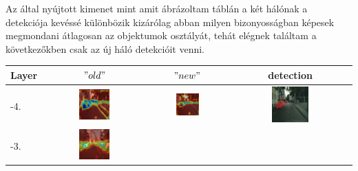 \documentclass[12pt,oneside,a4paper]{article}
\theoremstyle{remark}
\newcommand{\oldh}{\( "old" \)}\label{makro2}
\newcommand{\newh}{\( "new" \)}
\begin{document}
    Az  által nyújtott kimenet mint amit ábrázoltam  táblán\label{hivatkozas} a két hálónak a detekciója
    kevéssé különbözik kizárólag abban milyen bizonyosságban képesek megmondani átlagosan az objektumok osztályát, tehát elégnek találtam a következőkben csak az új háló detekcióit venni.


\begin{table}[h!]

    \noindent\begin{tabular}{|p{}|c|c|c|}
        \hline
        \noindent Layer&\oldh & \newh & detection\\
        \hline
        -4.&\includegraphics[width=0.316\textwidth]{old_layer-4} &
        \includegraphics[width=0.316\textwidth]{new_l-4} &
        \includegraphics[width=0.316\textwidth]{img} \\
        \hline
        -3.&\includegraphics[width=0.316\textwidth]{old_layer-3} &

\end{tabular}
\end{table}
\end{document}
